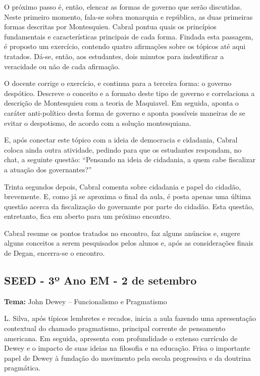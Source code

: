 \documentclass[12pt,a4paper]{article}
\begin{document}
	O próximo passo é, então, elencar as formas de governo que serão 
	discutidas. Neste primeiro momento, fala-se sobra monarquia e 
	república, as duas primeiras formas descritas por Montesquieu. 
	Cabral pontua quais os princípios fundamentais e 
	características principais de cada forma. Findada esta passagem, 
	é proposto um exercício, contendo quatro afirmações sobre os 
	tópicos até aqui tratados. Dá-se, então, aos estudantes, dois 
	minutos para indentificar a veracidade ou não de cada afirmação. 

	O docente corrige o exercício, e continua para a terceira forma: 
	o governo despótico. Descreve o conceito e a formato deste tipo 
	de governo e correlaciona a descrição de Montesquieu com a teoria 
	de Maquiavel. Em seguida, aponta o caráter anti-político desta 
	forma de governo e aponta possíveis maneiras de se evitar o 
	despotismo, de acordo com a solução montesquiana. 

	E, após conectar este tópico com a ideia de democracia e cidadania, 
	Cabral coloca ainda outra atividade, pedindo para que os estudantes 
	respondam, no chat, a seguinte questão: “Pensando na ideia de 
	cidadania, a quem cabe fiscalizar a atuação dos governantes?” 

	Trinta segundos depois, Cabral comenta sobre cidadania e papel 
	do cidadão, brevemente. E, como já se aproxima o final da aula, 
	é posta apenas uma última questão acerca da fiscalização do 
	governante por parte do cidadão. Esta questão, entretanto, fica 
	em aberto para um próximo encontro. 

	Cabral resume os pontos tratados no encontro, faz alguns anúncios e, 
	sugere alguns conceitos a serem pesquisados pelos alunos e, 
	após as considerações finais de Degan, encerra-se o encontro. 

	\subsection{SEED - 3º Ano EM - 2 de setembro}

	\textbf{Tema:} John Dewey -- Funcionalismo e Pragmatismo

	L. Silva, após típicos lembretes e recados, inicia a aula 
	fazendo uma apresentação contextual do chamado pragmatismo, 
	principal corrente de pensamento americana. Em seguida, 
	apresenta com profundidade o extenso currículo de Dewey e 
	o impacto de suas ideias na filosofia e na educação. Frisa 
	o importante papel de Dewey à fundação do movimento pela 
	escola progressiva e da doutrina pragmática. 
\end{document}
